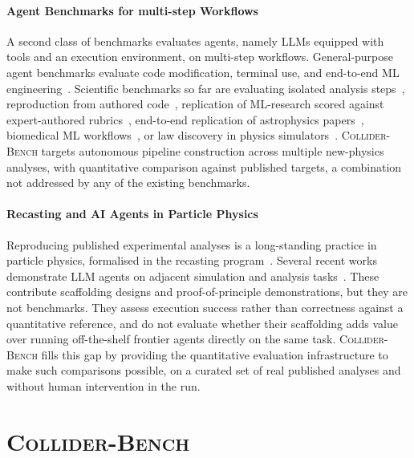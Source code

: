 \documentclass{article}
\newcommand{\ColliderBench}{\textsc{Collider-Bench}}
\begin{document}
\paragraph{Agent Benchmarks for multi-step Workflows}
A second class of benchmarks evaluates agents, namely LLMs equipped with tools and an execution environment, on multi-step workflows. General-purpose agent benchmarks evaluate code modification, terminal use, and end-to-end ML engineering~\citep{jimenez2024swebench, terminalbench2025, chan2024mlebench, wijk2024rebench}. Scientific benchmarks so far are evaluating isolated analysis steps~\citep{chen2024scienceagentbench}, reproduction from authored code~\citep{siegel2024corebench}, replication of ML-research scored against expert-authored rubrics~\citep{openai2025paperbench}, end-to-end replication of astrophysics papers~\citep{ye2025replicationbench}, biomedical ML workflows~\citep{bioml2025}, or law discovery in physics simulators~\citep{newtonbench2025, gravitybench2025}. \ColliderBench{} targets autonomous pipeline construction across multiple new-physics analyses, with quantitative comparison against published targets, a combination not addressed by any of the existing benchmarks.

\paragraph{Recasting and AI Agents in Particle Physics}
Reproducing published experimental analyses is a long-standing practice in particle physics, formalised in the recasting program~\citep{LHCReinterpretationForum:2020xtr}. Several recent works demonstrate LLM agents on adjacent simulation and analysis tasks~\citep{Gendreau-Distler:2025fsj, Menzo:2025cim, Moreno:2026mqk, Plehn:2026gxv, Qiu:2026iby, Agrawal:2026lvg}. These contribute scaffolding designs and proof-of-principle demonstrations, but they are not benchmarks. They assess execution success rather than correctness against a quantitative reference, and do not evaluate whether their scaffolding adds value over running off-the-shelf frontier agents directly on the same task. \ColliderBench{} fills this gap by providing the quantitative evaluation infrastructure to make such comparisons possible, on a curated set of real published analyses and without human intervention in the run.


\section{\ColliderBench{} }
\label{sec:benchmark}
\end{document}
